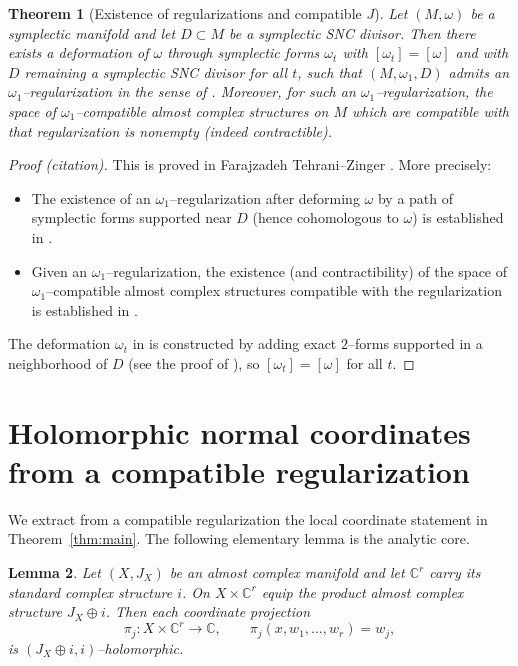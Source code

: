 \documentclass[11pt]{article}
\newtheorem{theorem}{Theorem}[section]
\newtheorem{lemma}[theorem]{Lemma}
\theoremstyle{definition}
\begin{document}
\begin{theorem}[Existence of regularizations and compatible $J$]\label{thm:FTZ}
Let $(M,\omega)$ be a symplectic manifold and let $D\subset M$ be a symplectic SNC divisor.
Then there exists a deformation of $\omega$ through symplectic forms $\omega_t$ with $[\omega_t]=[\omega]$ and with $D$ remaining a symplectic SNC divisor for all $t$, such that $(M,\omega_1,D)$ admits an $\omega_1$--regularization in the sense of \cite{FTZ}.
Moreover, for such an $\omega_1$--regularization, the space of $\omega_1$--compatible almost complex structures on $M$ which are compatible with that regularization is nonempty (indeed contractible).
\end{theorem}

\begin{proof}[Proof (citation)]
This is proved in Farajzadeh Tehrani--Zinger \cite{FTZ}.
More precisely:
\begin{itemize}
\item The existence of an $\omega_1$--regularization after deforming $\omega$ by a path of symplectic forms supported near $D$ (hence cohomologous to $\omega$) is established in \cite[Theorem~2.17]{FTZ}.
\item Given an $\omega_1$--regularization, the existence (and contractibility) of the space of $\omega_1$--compatible almost complex structures compatible with the regularization is established in \cite[Proposition~3.11]{FTZ}.
\end{itemize}
The deformation $\omega_t$ in \cite{FTZ} is constructed by adding exact $2$--forms supported in a neighborhood of $D$ (see the proof of \cite[Theorem~2.17]{FTZ}), so $[\omega_t]=[\omega]$ for all $t$.
\end{proof}

\section{Holomorphic normal coordinates from a compatible regularization}

We extract from a compatible regularization the local coordinate statement in Theorem~\ref{thm:main}.
The following elementary lemma is the analytic core.

\begin{lemma}\label{lem:prodhol}
Let $(X,J_X)$ be an almost complex manifold and let $\mathbb C^r$ carry its standard complex structure $i$.
On $X\times \mathbb C^r$ equip the product almost complex structure $J_X\oplus i$.
Then each coordinate projection
\[
\pi_j : X\times\mathbb C^r \to \mathbb C,\qquad \pi_j(x,w_1,\dots,w_r)=w_j,
\]
is $(J_X\oplus i,i)$--holomorphic.
\end{lemma}
\end{document}

